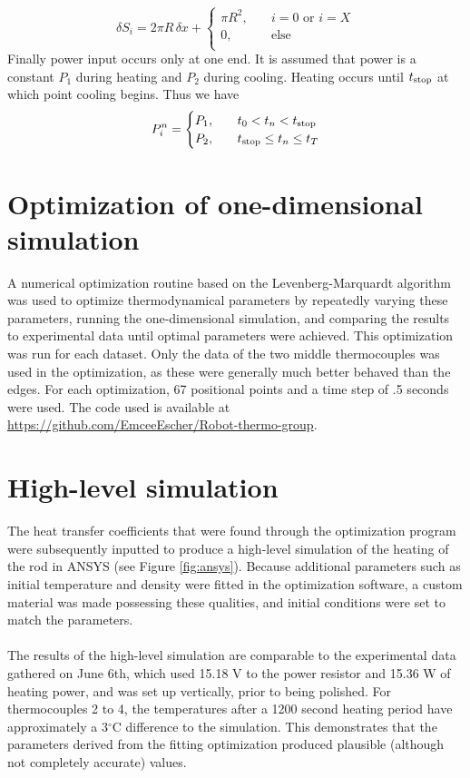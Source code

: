 \documentclass[letterpaper,titlepage,oneside]{report}
\begin{document}
\begin{equation*}
  \delta S_i = 2\pi R\,\delta x +
  \begin{cases}
    \pi R^2, & \quad i=0 \text{ or } i=X\\
    0,       & \quad \text{else}\\
  \end{cases}
\end{equation*}
Finally power input occurs only at one end. It is assumed that
power is a constant $P_1$ during heating and $P_2$ during cooling.
Heating occurs until $t_{\rm{stop}}$ at which point cooling begins.
Thus we have
\begin{equation*}
  P_i^n =
  \begin{cases}
    P_1, & \quad t_0 < t_n < t_{\rm{stop}}\\
    P_2, & \quad t_{\rm{stop}} \leq t_n \leq t_T\\
  \end{cases}
\end{equation*}

\section{Optimization of one-dimensional simulation}
A numerical optimization routine based on the
Levenberg-Marquardt algorithm was used to optimize
thermodynamical parameters by repeatedly varying these parameters,
running the one-dimensional simulation, and comparing the results to
experimental data until optimal parameters were achieved.
This optimization was run for each dataset.
Only the data of the two middle thermocouples was used in the optimization,
as these were generally much better behaved than the edges.
For each optimization, 67 positional points and a time step of .5 seconds
were used. The code used is available at
\url{https://github.com/EmceeEscher/Robot-thermo-group}.

\section{High-level simulation}
The heat transfer coefficients that were found through the
optimization program were subsequently inputted to produce a high-level
simulation of the heating of the rod in ANSYS
(see Figure \ref{fig:ansys}). Because additional
parameters such as initial temperature and density were
fitted in the optimization software, a custom material was made
possessing these qualities, and initial conditions were set to
match the parameters.
\\\\
The results of the high-level simulation are comparable to the
experimental data gathered on June 6th, which used 15.18 V
to the power resistor and 15.36 W of heating power, and was set
up vertically, prior to being polished. For thermocouples 2 to
4, the temperatures after a 1200 second heating period have
approximately a 3$^{\circ}$C difference to the simulation.
This demonstrates that the parameters derived from the fitting
optimization produced plausible (although not completely
accurate) values.
\end{document}
